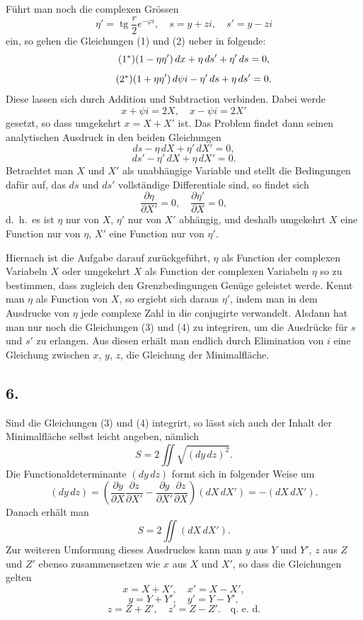 \documentclass[12pt,a4paper]{article}
\DeclareMathOperator{\tg}{tg}
\begin{document}
F\"uhrt man noch die complexen Gr\"ossen
\[\eta' = \tg\frac{r}{2} e^{-\varphi i}, \quad s = y + zi, \quad s' = y - zi\]
ein, so gehen die Gleichungen (1) und (2) ueber in folgende:
\begin{equation}\tag{1$^{*}$}
(1 - \eta\eta')\, dx + \eta\, ds' + \eta'\, ds = 0,
\end{equation}
\begin{equation}\tag{2$^{*}$}
(1 + \eta\eta')\, d\psi i - \eta'\, ds + \eta\, ds' = 0.
\end{equation}
Diese lassen sich durch Addition und Subtraction verbinden. Dabei werde
\[x + \psi i = 2X, \quad x - \psi i = 2X'\]
gesetzt, so dass umgekehrt $x = X + X'$ ist. Das Problem findet dann seinen analytischen Ausdruck in den beiden Gleichungen
\begin{equation}\tag{3}
ds - \eta\, dX + \eta'\, dX' = 0,
\end{equation}
\begin{equation}\tag{4}
ds' - \eta'\, dX + \eta\, dX' = 0.
\end{equation}
Betrachtet man $X$ und $X'$ als unabh\"angige Variable und stellt die Bedingungen daf\"ur auf, das $ds$ und $ds'$ vollst\"andige Differentiale sind, so findet sich
\[\frac{\partial \eta}{\partial X'} = 0, \quad \frac{\partial \eta'}{\partial X} = 0,\]
d.\ h.\ es ist $\eta$ nur von $X$, $\eta'$ nur von $X'$ abh\"angig, und deshalb umgekehrt $X$ eine Function nur von $\eta$, $X'$ eine Function nur von $\eta'$.

\newpage
Hiernach ist die Aufgabe darauf zur\"uckgef\"uhrt, $\eta$ als Function der complexen Variabeln $X$ oder umgekehrt $X$ als Function der complexen Variabeln $\eta$ so zu bestimmen, dass zugleich den Grenzbedingungen Gen\"uge geleistet werde. Kennt man $\eta$ als Function von $X$, so ergiebt sich daraus $\eta'$, indem man in dem Ausdrucke von $\eta$ jede complexe Zahl in die conjugirte verwandelt. Alsdann hat man nur noch die Gleichungen (3) und (4) zu integriren, um die Ausdr\"ucke f\"ur $s$ und $s'$ zu erlangen. Aus diesen erh\"alt man endlich durch Elimination von $i$ eine Gleichung zwischen $x$, $y$, $z$, die Gleichung der Minimalfl\"ache.

\subsection*{6.}

Sind die Gleichungen (3) und (4) integrirt, so l\"asst sich auch der Inhalt der Minimalfl\"ache selbst leicht angeben, n\"amlich
\[S = 2 \iint \sqrt{(dy\, dz)^{2}}.\]
Die Functionaldeterminante $(dy\, dz)$ formt sich in folgender Weise um
\[(dy\, dz) = \left(\frac{\partial y}{\partial X} \frac{\partial z}{\partial X'} - \frac{\partial y}{\partial X'} \frac{\partial z}{\partial X}\right) (dX\, dX') = -(dX\, dX').\]
Danach erh\"alt man
\[S = 2 \iint (dX\, dX').\]
Zur weiteren Umformung dieses Ausdruckes kann man $y$ aus $Y$ und $Y'$, $z$ aus $Z$ und $Z'$ ebenso zusammensetzen wie $x$ aus $X$ und $X'$, so dass die Gleichungen gelten
\[x = X + X', \quad x' = X - X',\]
\[y = Y + Y', \quad y' = Y - Y',\]
\[z = Z + Z', \quad z' = Z - Z'.\quad \text{q.\ e.\ d.}\]
\end{document}
